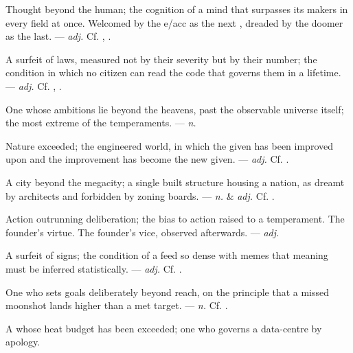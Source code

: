  Thought beyond the human; the cognition of a mind that surpasses its makers in every field at once. Welcomed by the e/acc as the next , dreaded by the doomer as the last. ---  \textit{adj.} Cf. , .

 A surfeit of laws, measured not by their severity but by their number; the condition in which no citizen can read the code that governs them in a lifetime. ---  \textit{adj.} Cf. , .

 One whose ambitions lie beyond the heavens, past the observable universe itself; the most extreme of the  temperaments.  ---  \textit{n.}

 Nature exceeded; the engineered world, in which the given has been improved upon and the improvement has become the new given. ---  \textit{adj.} Cf. .

 A city beyond the megacity; a single built structure housing a nation, as dreamt by architects and forbidden by zoning boards. ---  \textit{n.} \& \textit{adj.} Cf. .

 Action outrunning deliberation; the bias to action raised to a temperament.   The founder's virtue.   The founder's vice, observed afterwards. ---  \textit{adj.}

 A surfeit of signs; the condition of a feed so dense with memes that meaning must be inferred statistically. ---  \textit{adj.} Cf. .

 One who sets goals deliberately beyond reach, on the principle that a missed moonshot lands higher than a met target. ---  \textit{n.} Cf. .

  A  whose heat budget has been exceeded; one who governs a data-centre by apology.
